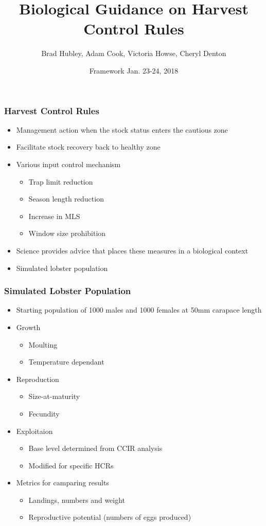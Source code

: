 \documentclass{beamer}
\title[HCR Guidance]{Biological Guidance on Harvest Control Rules}
\author[Hubley, Cook, Howse and Denton]{Brad Hubley, Adam Cook, Victoria Howse, Cheryl Denton}
\institute[DFO]{Science Branch, Fisheries and Oceans Canada}
\date{Framework Jan. 23-24, 2018}
\begin{document}
 
\frame{\titlepage}
 

\begin{frame}
\frametitle{Harvest Control Rules}

\begin{itemize}
\item Management action when the stock status enters the cautious zone 
\item Facilitate stock recovery back to healthy zone 
\item Various input control mechanism
\begin{itemize}
\item Trap limit reduction
\item Season length reduction
\item Increase in MLS
\item Window size prohibition
\end{itemize}
\item Science provides advice that places these measures in a biological context 
\item Simulated lobster population
\end{itemize}

\end{frame}


\begin{frame}
\frametitle{Simulated Lobster Population}
    \begin{itemize}
    \item Starting population of 1000 males and 1000 females at 50mm carapace length 
    \item Growth 
    \begin{itemize}
        \item Moulting
        \item Temperature dependant
    \end{itemize}
    \item Reproduction
    \begin{itemize}
        \item Size-at-maturity
        \item Fecundity
    \end{itemize}
    \item Exploitaion
    \begin{itemize}
        \item Base level determined from CCIR analysis
        \item Modified for specific HCRs
    \end{itemize}
    \item Metrics for camparing results
    \begin{itemize}
        \item Landings, numbers and weight
        \item Reproductive potential (numbers of eggs produced)
    \end{itemize}
    \end{itemize}
\end{frame}
\end{document}
